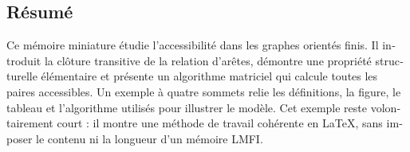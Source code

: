 \begin{otherlanguage}{french}
\chapter*{Résumé}


Ce mémoire miniature étudie l'accessibilité dans les graphes orientés finis. Il
introduit la clôture transitive de la relation d'arêtes, démontre une propriété
structurelle élémentaire et présente un algorithme matriciel qui calcule toutes
les paires accessibles. Un exemple à quatre sommets relie les définitions, la
figure, le tableau et l'algorithme utilisés pour illustrer le modèle. Cet exemple
reste volontairement court : il montre une méthode de travail cohérente en
LaTeX, sans imposer le contenu ni la longueur d'un mémoire LMFI.

\medskip
\noindent\textbf{\TemplateKeywordsLabel} \ThesisKeywordsFR
\end{otherlanguage}
